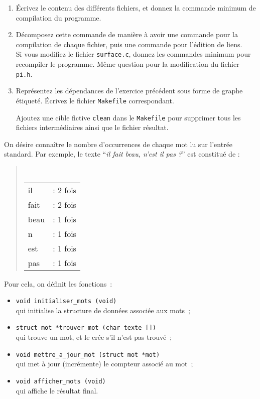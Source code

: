 \begin {enumerate}
    \item
	Écrivez le contenu des différents fichiers, et
	donnez la commande minimum de compilation du programme.

    \item
	Décomposez cette commande de manière à avoir une commande pour
	la compilation de chaque fichier, puis une commande pour
	l'édition de liens.  \\
	Si vous modifiez le fichier {\tt surface.c}, donnez les
	commandes minimum pour recompiler le programme.  Même question
	pour la modification du fichier {\tt pi.h}.

    \item
	Représentez les dépendances de l'exercice précédent sous forme
	de graphe étiqueté.  Écrivez le fichier {\tt Makefile}
	correspondant.

	Ajoutez une cible fictive {\tt clean} dans le {\tt Makefile}
	pour supprimer tous les fichiers intermédiaires ainsi que le
	fichier résultat.

\end {enumerate}


\question

On désire connaître le nombre d'occurrences de chaque mot lu sur
l'entrée standard.  Par exemple, le texte ``{\em il fait beau, n'est il
pas ?}'' est constitué de :

\begin {quote}
    \renewcommand {\arraystretch} {0.9}
    \tt
    \begin {tabular} {ll}
	il   & : 2 fois \\
	fait & : 2 fois \\
	beau & : 1 fois \\
	n    & : 1 fois \\
	est  & : 1 fois \\
	pas  & : 1 fois 
    \end {tabular}
\end {quote}

Pour cela, on définit les fonctions~:

\begin {itemize}
    \item \verb:void initialiser_mots (void): \\
	qui initialise la structure de données associée aux mots~;

    \item \verb:struct mot *trouver_mot (char texte []): \\
	qui trouve un mot, et le crée s'il n'est pas trouvé~;

    \item \verb:void mettre_a_jour_mot (struct mot *mot): \\
	qui met à jour (incrémente) le compteur associé au mot~;

    \item \verb:void afficher_mots (void): \\
	qui affiche le résultat final.

\end {itemize}


